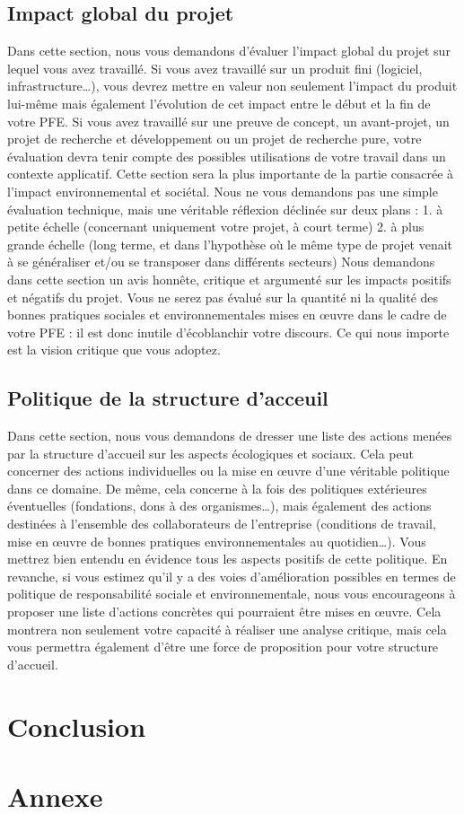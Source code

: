 \documentclass[12pt]{article}
\begin{document}
\subsection*{Impact global du projet}
Dans cette section, nous vous demandons d’évaluer l’impact global du projet sur lequel vous avez travaillé. Si vous avez travaillé sur un produit fini (logiciel, infrastructure…), vous devrez mettre en valeur non seulement l’impact du produit lui-même mais également l’évolution de cet impact entre le début et la fin de votre PFE. Si vous avez travaillé sur une preuve de concept, un avant-projet, un projet de recherche et développement ou un projet de recherche pure, votre évaluation devra tenir compte des possibles utilisations de votre travail dans un contexte applicatif. Cette section sera la plus importante de la partie consacrée à l’impact environnemental et sociétal. Nous ne vous demandons pas une simple évaluation technique, mais une véritable réflexion déclinée sur deux plans :
1. à petite échelle (concernant uniquement votre projet, à court terme)
2. à plus grande échelle (long terme, et dans l’hypothèse où le même type de projet venait à se généraliser et/ou
se transposer dans différents secteurs)
Nous demandons dans cette section un avis honnête, critique et argumenté sur les impacts positifs et négatifs du projet. Vous ne serez pas évalué sur la quantité ni la qualité des bonnes pratiques sociales et environnementales mises en œuvre dans le cadre de votre PFE : il est donc inutile d’écoblanchir votre discours. Ce qui nous importe est la vision critique que vous adoptez.

\subsection*{Politique de la structure d'acceuil}
Dans cette section, nous vous demandons de dresser une liste des actions menées par la structure d’accueil sur les aspects écologiques et sociaux. Cela peut concerner des actions individuelles ou la mise en œuvre d’une véritable politique dans ce domaine. De même, cela concerne à la fois des politiques extérieures éventuelles (fondations, dons à des organismes…), mais également des actions destinées à l’ensemble des collaborateurs de l’entreprise (conditions de travail, mise en œuvre de bonnes pratiques environnementales au quotidien…). Vous mettrez bien entendu en évidence tous les aspects positifs de cette politique. En revanche, si vous estimez qu’il y a des voies d’amélioration possibles en termes de politique de responsabilité sociale et environnementale, nous vous encourageons à proposer une liste d’actions concrètes qui pourraient être mises en œuvre. Cela montrera non seulement votre capacité à réaliser une analyse critique, mais cela vous permettra également d’être une force de proposition pour votre structure d’accueil.
\section{Conclusion}

\newpage
{}
\printbibliography
\section{Annexe}
\end{document}
